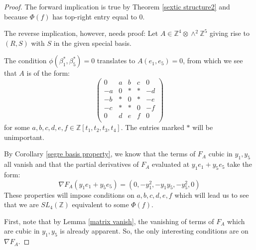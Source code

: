 \documentclass{report}
\begin{document}
\begin{proof}

The forward implication is true by Theorem \ref{sextic structure2} and because $\Phi(f)$ has top-right entry equal to 0.

The reverse implication, however, needs proof:  Let $A \in \mathbb{Z}^4 \otimes \wedge^2 \mathbb{Z}^5$ giving rise to $(R,S)$ with $S$ in the given special basis.

The condition $\phi (\beta_1^*, \beta_5^*) = 0$ translates to $A(e_1,e_5) = 0$, from which we see that $A$ is of the form:
\begin{equation}
\begin{pmatrix}
0 & a & b & c & 0 \\
- a & 0 & * & * & - d \\
- b & * & 0 & * & - e \\
- c & * & * & 0 & - f \\
0 & d & e & f & 0 \\
\end{pmatrix}
\end{equation}
for some $a,b,c,d,e,f \in \mathbb{Z}[t_1,t_2,t_3,t_4]$.  The entries marked $*$ will be unimportant.

By Corollary \ref{segre basis property}, we know that the terms of $F_A$ cubic in $y_1, y_5$ all vanish and that the partial derivatives of $F_A$ evaluated at $y_1 e_1 + y_5 e_5$ take the form:
\begin{equation}
\nabla F_A (y_1 e_1 + y_5 e_5) = (0, - y_1^2, - y_1 y_5, - y_5^2, 0)
\end{equation}
These properties will impose conditions on $a,b,c,d,e,f$ which will lead us to see that we are $SL_4(\mathbb{Z})$ equivalent to some $\Phi(f)$.

First, note that by Lemma \ref{matrix vanish}, the vanishing of terms of $F_A$ which are cubic in $y_1, y_5$ is already apparent.  So, the only interesting conditions are on $\nabla F_A$.


\end{proof}
\end{document}
